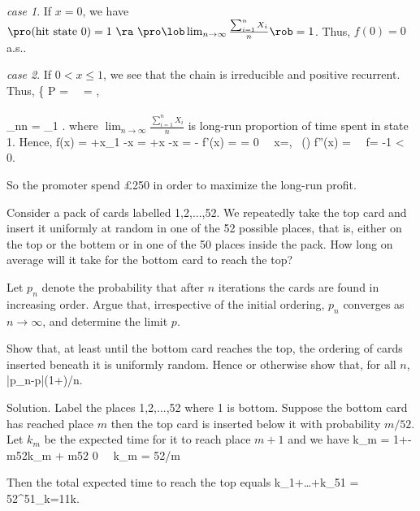 \emph{case 1}. If $x=0$, we have $\pro(\text{hit state 0})=1 \ \ra \ \pro\lob\lim_{n\to\infty}\frac{\sum^{n}_{i=1} X_i}n\rob = 1$. Thus, $f(0)=0$ a.s..

\emph{case 2}. If $0<x\leq 1$, we see that the chain is irreducible and positive recurrent. Thus,
\be
\left\{
\pi P = \pi \ \ra \ \pi = \lob{},\ \rob\\
\\
\pro\lob\lim_{n\to\infty}n = \pi_1
\ea\right.
\ee
where $\lim_{n\to\infty}\frac{\sum^{n}_{i=1} X_i}n$ is long-run proportion of time spent in state 1. Hence,
\be
f(x) = \lob{}+x\rob\pi_1 -x = \lob{}+x\rob{} -x =  - 
\ee
\be
f'(x) =  = 0 \ \ra \ x=, \ ()
\ee
\be
f''(x) =  \ \ra \ f\lob{}\rob = -1 < 0.
\ee

So the promoter spend \pounds 250 in order to maximize the long-run profit.

\begin{exercise}
Consider a pack of cards labelled 1,2,...,52. We repeatedly take the top card and insert it uniformly at random in one of the 52 possible places, that is, either on the top or the bottem or in one of the 50 places inside the pack. How long on average will it take for the bottom card to reach the top?

Let $p_n$ denote the probability that after $n$ iterations the cards are found in increasing order. Argue that, irrespective of the initial ordering, $p_n$ converges as $n\to\infty$, and determine the limit $p$.

Show that, at least until the bottom card reaches the top, the ordering of cards inserted beneath it is uniformly random. Hence or otherwise show that, for all $n$,
\be
|p_n-p|(1+)/n.
\ee
\end{exercise}

Solution. Label the places 1,2,...,52 where 1 is bottom. Suppose the bottom card has reached place $m$ then the top card is inserted below it with probability $m/52$. Let $k_m$ be the expected time for it to reach place $m+1$ and we have
\be
k_m = 1+-\frac m{52}\rob k_m + \frac m{52} 0 \ \ra \ k_m = 52/m
\ee

Then the total expected time to reach the top equals
\be
k_1+\dots+k_{51} = 52\sum^{51}_{k=1}\frac 1k.
\ee

